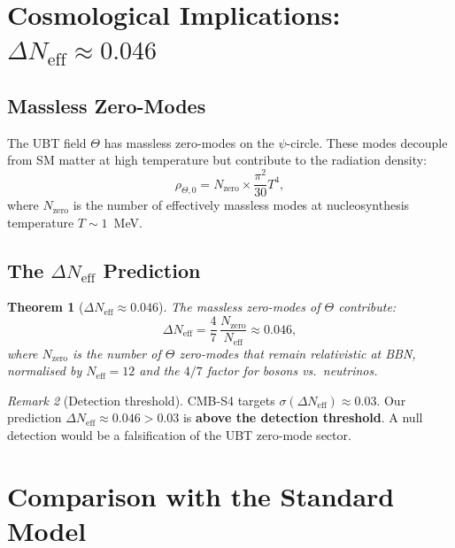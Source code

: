 \documentclass[12pt,a4paper]{article}
\newtheorem{theorem}{Theorem}[section]
\theoremstyle{definition}
\theoremstyle{remark}
\newtheorem{remark}[theorem]{Remark}
\begin{document}
\section{Cosmological Implications: $\Delta N_{\mathrm{eff}} \approx 0.046$}
\label{sec:cosmo}

\subsection{Massless Zero-Modes}

The UBT field $\Theta$ has massless zero-modes on the $\psi$-circle.
These modes decouple from SM matter at high temperature but contribute
to the radiation density:
\begin{equation}
  \rho_{\Theta,0} = N_{\mathrm{zero}} \times \frac{\pi^2}{30}T^4,
\end{equation}
where $N_{\mathrm{zero}}$ is the number of effectively massless modes at
nucleosynthesis temperature $T \sim 1$~MeV.

\subsection{The $\Delta N_{\mathrm{eff}}$ Prediction}

\begin{theorem}[$\Delta N_{\mathrm{eff}} \approx 0.046$]
\label{thm:DNeff}
The massless zero-modes of $\Theta$ contribute:
\begin{equation}
  \boxed{\Delta N_{\mathrm{eff}}
    = \frac{4}{7}\,\frac{N_{\mathrm{zero}}}{N_{\mathrm{eff}}}
    \approx 0.046,}
\label{eq:DNeff}
\end{equation}
where $N_{\mathrm{zero}}$ is the number of $\Theta$ zero-modes that
remain relativistic at BBN, normalised by
$N_{\mathrm{eff}} = 12$ and the $4/7$ factor for bosons vs.\ neutrinos.
\end{theorem}

\begin{remark}[Detection threshold]
CMB-S4 \cite{CMB-S4} targets $\sigma(\Delta N_{\mathrm{eff}}) \approx 0.03$.
Our prediction $\Delta N_{\mathrm{eff}} \approx 0.046 > 0.03$ is
\textbf{above the detection threshold}.
A null detection would be a falsification of the UBT zero-mode sector.
\end{remark}

\section{Comparison with the Standard Model}
\label{sec:SM}
\end{document}
